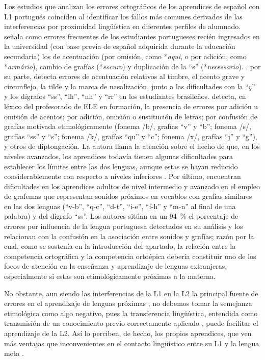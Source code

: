 \documentclass[spanish]{textolivre}
\begin{document}
Los estudios que analizan los errores ortográficos de los aprendices de español con L1 portugués coinciden al identificar los fallos más comunes derivados de las interferencias por proximidad lingüística en diferentes perfiles de alumnado. \textcite[p. 30]{perez_ensenanza_2007} señala como errores frecuentes de los estudiantes portugueses recién ingresados en la universidad (con base previa de español adquirida durante la educación secundaria) los de acentuación (por omisión, como *\textit{aqui}, o por adición, como *\textit{armário}), cambio de grafías (*\textit{escuro}) y duplicación de la “s” (*\textit{necessario}). \textcite{andrade_neta_aprender_2000}, por su parte, detecta errores de acentuación relativos al timbre, el acento grave y circunflejo, la tilde y la marca de nasalización, junto a las dificultades con la “ç” y los dígrafos “ss”, “lh”, “nh” y “rr” en los estudiantes brasileños. \textcite{baerlocher_rocha_errores_2013} detecta, en léxico del profesorado de ELE en formación, la presencia de errores por adición u omisión de acentos; por adición, omisión o sustitución de letras; por confusión de grafías motivada etimológicamente (fonema /b/, grafías “v” y “b”; fonema /s/, grafías “ss” y “s”; fonema /k/, grafías “qu” y “c”; fonema /x/, grafías “j” y “g”), y otros de diptongación. La autora llama la atención sobre el hecho de que, en los niveles avanzados, los aprendices todavía tienen algunas dificultades para establecer los límites entre las dos lenguas, aunque estas se hayan reducido considerablemente con respecto a niveles inferiores \cite{baerlocher_rocha_errores_2013}. Por último, \textcite{cardoso_interferencias_2022} encuentran dificultades en los aprendices adultos de nivel intermedio y avanzado en el empleo de grafemas que representan sonidos próximos en vocablos con grafías similares en las dos lenguas (“v-b”, “q-c”, “d-t”, “i-e”, “f-h” y “m-n” al final de una palabra) y del dígrafo “ss”. Los autores sitúan en un 94~\% el porcentaje de errores por influencia de la lengua portuguesa detectados en su análisis y los relacionan con la confusión en la asociación entre sonidos y grafías; razón por la cual, como se sostenía en la introducción del apartado, la relación entre la competencia ortográfica y la competencia ortoépica debería constituir uno de los focos de atención en la enseñanza y aprendizaje de lenguas extranjeras, especialmente si estas son etimológicamente próximas a la materna.

No obstante, aun siendo las interferencias de la L1 en la L2 la principal fuente de errores en el aprendizaje de lenguas próximas \cite{capilla_o_2009}, no debemos tomar la semejanza etimológica como algo negativo, pues la transferencia lingüística, entendida como transmisión de un conocimiento previo correctamente aplicado \cite{brown_principles_2000}, puede facilitar el aprendizaje de la L2. Así lo perciben, de hecho, los propios aprendices, que ven más ventajas que inconvenientes en el contacto lingüístico entre su L1 y la lengua meta \cite{aires_influencia_2018,espinosa_creencias_2009}.
\end{document}

